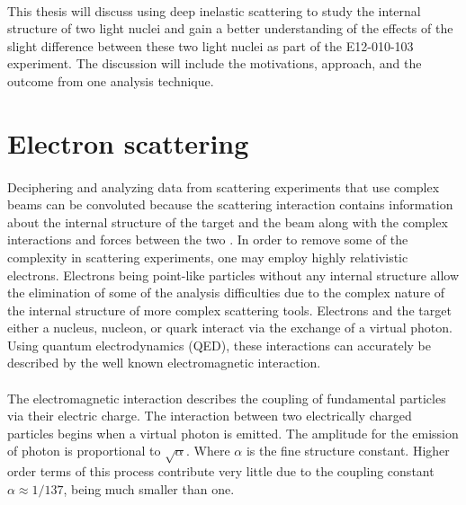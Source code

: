 \paragraph{}This thesis will discuss using deep inelastic scattering to study the internal structure of two light nuclei and gain a better understanding of the effects of the slight difference between these two light nuclei as part of the E12-010-103 experiment. The discussion will include the motivations, approach, and the outcome from one analysis technique.

\section{Electron scattering}\label{sec:escat}
\paragraph{}Deciphering and analyzing data from scattering experiments that use complex beams can be convoluted because the scattering interaction contains information about the internal structure of the target and the beam along with the complex interactions and forces between the two \cite{PnN}.  In order to remove some of the complexity in scattering experiments, one may employ highly relativistic electrons. Electrons being point-like particles without any internal structure allow the elimination of some of the analysis difficulties due to the complex nature of the internal structure of more complex scattering tools. Electrons and the target either a nucleus, nucleon, or quark interact via the exchange of a virtual photon. Using quantum electrodynamics (QED), these interactions can accurately be described by the well known electromagnetic interaction.
\paragraph{}The electromagnetic interaction describes the coupling of fundamental particles via their electric charge. The interaction between two electrically charged particles begins when a virtual photon is emitted. The amplitude for the emission of photon is proportional to $\sqrt{\alpha}$. Where $\alpha$ is the fine structure constant. Higher order terms of this process contribute very little due to the coupling constant $\alpha \approx 1/137 $, being much smaller than one. 
